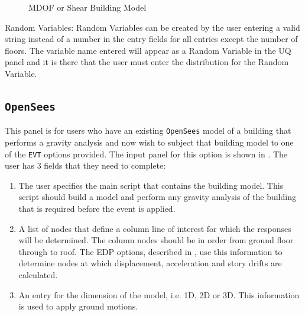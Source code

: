 \begin{figure}[!htbp]
  \caption{MDOF or Shear Building Model}
  \label{fig:mdof}
\end{figure}

Random Variables: Random Variables can be created by the user entering
a valid string instead of a number in the entry fields for all entries
except the number of floors. The variable name entered will appear as
a Random Variable in the UQ panel and it is there that the user must
enter the distribution for the Random Variable.

\subsection{\texttt{OpenSees}}\label{sec:OpenSeesSIM}
This panel is for users who have an existing \texttt{OpenSees} model of a
building that performs a gravity analysis and now wish to subject that
building model to one of the \texttt{EVT} options provided. The input panel
for this option is shown in . The user has 3 fields
that they need to complete:
\begin{enumerate} 
\item The user specifies the main script that contains the building
  model. This script should build a model and perform any gravity
  analysis of the building that is required before the event is
  applied.
\item A list of nodes that define a column line of interest for which
  the responses will be determined. The column nodes should be in
  order from ground floor through to roof. The EDP options, described
  in , use this information to determine nodes at which
  displacement, acceleration and story drifts are calculated.
\item An entry for the dimension of the model, i.e. 1D, 2D or 3D. This
  information is used to apply ground motions.
\end{enumerate}

